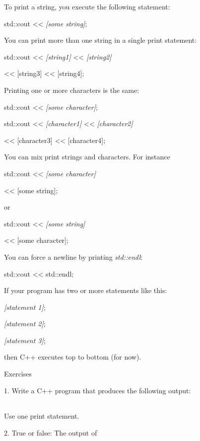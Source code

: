\documentclass[
]{article}
\begin{document}
To print a string, you execute the following statement:

std::cout \textless\textless{} \emph{{[}some string{]}};

You can print more than one string in a single print statement:

std::cout \textless\textless{} \emph{{[}string1{]}} \textless\textless{}
\emph{{[}string2{]}}

\textless\textless{} {[}string3{]} \textless\textless{} {[}string4{]};

Printing one or more characters is the same:

std::cout \textless\textless{} \emph{{[}some character{]}};

std::cout \textless\textless{} \emph{{[}character1{]}}
\textless\textless{} \emph{{[}character2{]}}

\textless\textless{} {[}character3{]} \textless\textless{}
{[}character4{]};

You can mix print strings and characters. For instance

std::cout \textless\textless{} \emph{{[}some character{]}}

\textless\textless{} {[}some string{]};

or

std::cout \textless\textless{} \emph{{[}some string{]}}

\textless\textless{} {[}some character{]};

You can force a newline by printing \emph{std::endl}:

std::cout \textless\textless{} std::endl;

If your program has two or more statements like this:

\emph{{[}statement 1{]}};

\emph{{[}statement 2{]}};

\emph{{[}statement 3{]}};

then C++ executes top to bottom (for now).

Exercises

1. Write a C++ program that produces the following output:

\begin{longtable}[]{@{}@{}}
\toprule
\endhead
\bottomrule
\end{longtable}

Use one print statement.

2. True or false: The output of

\begin{longtable}[]{@{}@{}}
\toprule
\endhead
\bottomrule
\end{longtable}
\end{document}
